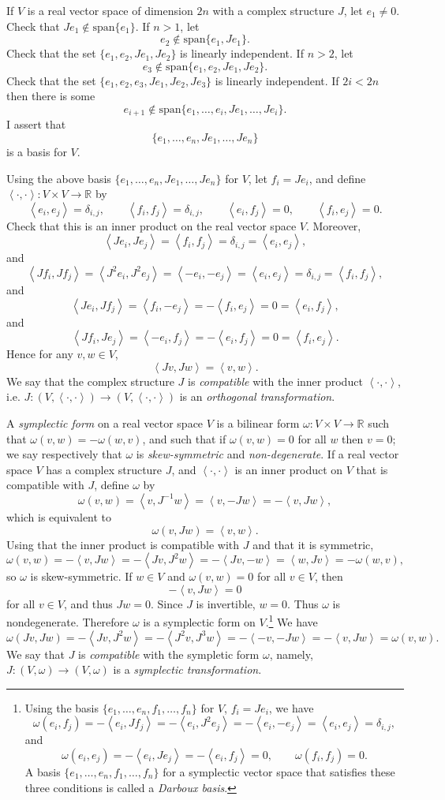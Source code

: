 \documentclass{article}
\newcommand{\inner}[2]{\left\langle #1, #2 \right\rangle}
\newcommand{\Span}{\textrm{span}}
\begin{document}
If $V$ is a real vector space of dimension $2n$ with a complex structure $J$, let $e_1 \neq 0$. Check that $J e_1 \not \in \Span\{e_1\}$. If $n > 1$, let
\[
e_2 \not \in \Span\{e_1,Je_1\}.
\]
Check that the set $\{e_1,e_2,Je_1,Je_2\}$ is linearly independent. If $n > 2$, let 
\[
e_3 \not \in \Span\{e_1,e_2,Je_1,Je_2\}.
\]
Check that the set $\{e_1,e_2,e_3,Je_1,Je_2,Je_3\}$ is linearly independent. If $2i<2n$ then there is some
\[
e_{i+1} \not \in \Span\{e_1,\ldots,e_i,Je_1,\ldots,Je_i\}.
\]
I assert that 
\[
\{e_1,\ldots,e_n,Je_1,\ldots,Je_n\}
\]
is a basis for $V$. 

Using the above basis $\{e_1,\ldots,e_n,Je_1,\ldots,Je_n\}$ for $V$, let $f_i=Je_i$, and define $\inner{\cdot}{\cdot}:V \times V \to \mathbb{R}$ by
\[
\inner{e_i}{e_j}=\delta_{i,j}, \qquad \inner{f_i}{f_j}=\delta_{i,j},\qquad \inner{e_i}{f_j}=0, \qquad
\inner{f_i}{e_j}=0.
\]
Check that this is an inner product on the real vector space $V$. Moreover, 
\[
\inner{Je_i}{Je_j}=\inner{f_i}{f_j}=\delta_{i,j}=\inner{e_i}{e_j},
\]
and
\[
\inner{Jf_i}{Jf_j}=\inner{J^2 e_i}{J^2 e_j}=\inner{-e_i}{-e_j}=\inner{e_i}{e_j}=\delta_{i,j}=\inner{f_i}{f_j},
\]
and
\[
\inner{Je_i}{Jf_j}=\inner{f_i}{-e_j}=-\inner{f_i}{e_j}=0=\inner{e_i}{f_j},
\]
and
\[
\inner{Jf_i}{Je_j}=\inner{-e_i}{f_j}=-\inner{e_i}{f_j}=0=\inner{f_i}{e_j}.
\]
Hence for any $v,w \in V$,
\[
\inner{Jv}{Jw}=\inner{v}{w}.
\]
We say that the complex structure $J$ is {\em compatible} with the inner product $\inner{\cdot}{\cdot}$, i.e.
$J:(V,\inner{\cdot}{\cdot}) \to (V,\inner{\cdot}{\cdot})$ is an {\em orthogonal transformation}.

A {\em symplectic form} on a real vector space $V$ is a bilinear form $\omega:V \times V \to \mathbb{R}$
such that $\omega(v,w)=-\omega(w,v)$, and such that if $\omega(v,w)=0$ for all $w$ then
$v=0$; we say respectively that $\omega$ is {\em skew-symmetric} and {\em non-degenerate}.
If a real vector space $V$ has a complex structure $J$, and $\inner{\cdot}{\cdot}$ is an inner product on $V$ that is compatible with $J$,
 define $\omega$ by
\[
\omega(v,w)=\inner{v}{J^{-1}w}=\inner{v}{-Jw}=-\inner{v}{Jw},
\]
which is equivalent to
\[
\omega(v,Jw)=\inner{v}{w}.
\]
Using that the inner product is compatible with $J$ and that it is symmetric,
\[
\omega(v,w)=-\inner{v}{Jw}=-\inner{Jv}{J^2 w}=-\inner{Jv}{-w}=\inner{w}{Jv}=-\omega(w,v),
\]
so $\omega$ is skew-symmetric. If $w \in V$ and $\omega(v,w)=0$ for all $v \in V$, then
\[
-\inner{v}{Jw}=0
\]
for all $v \in V$, and thus $Jw=0$. Since $J$ is invertible, $w=0$. Thus $\omega$ is nondegenerate. Therefore
$\omega$ is a symplectic form on $V$.\footnote{Using the basis
$\{e_1,\ldots,e_n,f_1,\ldots,f_n\}$ for $V$, $f_i=Je_i$, we have 
\[
\omega(e_i,f_j)=-\inner{e_i}{Jf_j}=-\inner{e_i}{J^2e_j}=-\inner{e_i}{-e_j}=\inner{e_i}{e_j}=\delta_{i,j},
\]
and
\[
\omega(e_i,e_j)=-\inner{e_i}{Je_j}=-\inner{e_i}{f_j}=0, \qquad \omega(f_i,f_j)=0.
\]
A basis $\{e_1,\ldots,e_n,f_1,\ldots,f_n\}$ for a symplectic vector space that satisfies these three conditions
is called a {\em Darboux basis}.}
We have
\[
\omega(Jv,Jw)=-\inner{Jv}{J^2w}=-\inner{J^2v}{J^3w}=-\inner{-v}{-Jw}=-\inner{v}{Jw}=\omega(v,w).
\]
We say that $J$ is {\em compatible} with the sympletic form $\omega$, namely, $J:(V,\omega) \to (V,\omega)$ is
a {\em symplectic transformation}.
\end{document}
